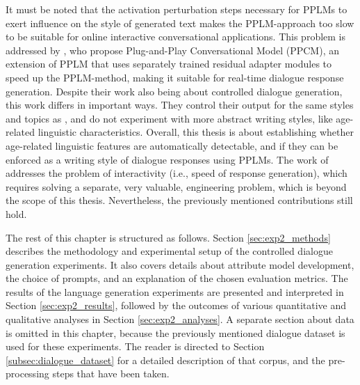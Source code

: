 It must be noted that the activation perturbation steps necessary for PPLMs to exert influence on the style of generated text makes the PPLM-approach too slow to be suitable for online interactive conversational applications. This problem is addressed by \cite{madotto-etal-2020-plug}, who propose Plug-and-Play Conversational Model (PPCM), an extension of PPLM that uses separately trained residual adapter modules to speed up the PPLM-method, making it suitable for real-time dialogue response generation. Despite their work also being about controlled dialogue generation, this work differs in important ways. They control their output for the same styles and topics as \cite{dathathri2019plug}, and do not experiment with more abstract writing styles, like age-related linguistic characteristics. Overall, this thesis is about establishing whether age-related linguistic features are automatically detectable, and if they can be enforced as a writing style of dialogue responses using PPLMs. The work of \cite{madotto-etal-2020-plug} addresses the problem of interactivity (i.e., speed of response generation), which requires solving a separate, very valuable, engineering problem, which is beyond the scope of this thesis. Nevertheless, the previously mentioned contributions still hold.

The rest of this chapter is structured as follows. Section \ref{sec:exp2_methods} describes the methodology and experimental setup of the controlled dialogue generation experiments. It also covers details about attribute model development, the choice of prompts, and an explanation of the chosen evaluation metrics. The results of the language generation experiments are presented and interpreted in Section \ref{sec:exp2_results}, followed by the outcomes of various quantitative and qualitative analyses in Section \ref{sec:exp2_analyses}. A separate section about data is omitted in this chapter, because the previously mentioned dialogue dataset is used for these experiments. The reader is directed to Section \ref{subsec:dialogue_dataset} for a detailed description of that corpus, and the pre-processing steps that have been taken.


